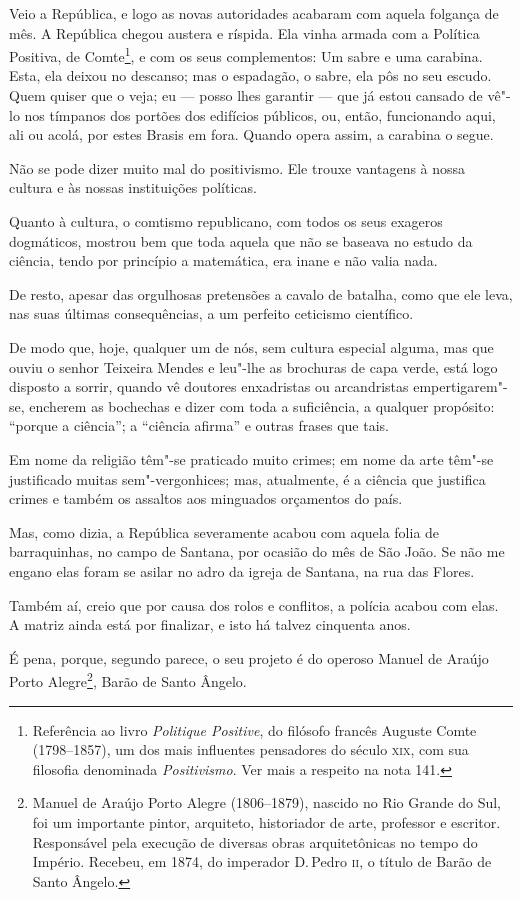 Veio a República, e logo as novas autoridades acabaram com aquela
folgança de mês. A República chegou austera e ríspida. Ela vinha armada
com a Política Positiva, de Comte\footnote{Referência ao livro
  \emph{Politique Positive}, do filósofo francês Auguste Comte (1798--1857), um dos mais influentes pensadores do século \textsc{xix}, com sua
  filosofia denominada \emph{Positivismo}. Ver mais a respeito na nota
  141.}, e com os seus complementos: Um sabre e uma carabina. Esta, ela
deixou no descanso; mas o espadagão, o sabre, ela pôs no seu escudo.
Quem quiser que o veja; eu --- posso lhes garantir --- que já estou
cansado de vê"-lo nos tímpanos dos portões dos edifícios públicos, ou,
então, funcionando aqui, ali ou acolá, por estes Brasis em fora. Quando
opera assim, a carabina o segue.

Não se pode dizer muito mal do positivismo. Ele trouxe vantagens à nossa
cultura e às nossas instituições políticas.

Quanto à cultura, o comtismo republicano, com todos os seus exageros
dogmáticos, mostrou bem que toda aquela que não se baseava no estudo da
ciência, tendo por princípio a matemática, era inane e não valia nada.

De resto, apesar das orgulhosas pretensões a cavalo de batalha, como que
ele leva, nas suas últimas consequências, a um perfeito ceticismo
científico.

De modo que, hoje, qualquer um de nós, sem cultura especial alguma, mas
que ouviu o senhor Teixeira Mendes e leu"-lhe as brochuras de capa verde,
está logo disposto a sorrir, quando vê doutores enxadristas ou
arcandristas empertigarem"-se, encherem as bochechas e dizer com toda a
suficiência, a qualquer propósito: ``porque a ciência''; a ``ciência
afirma'' e outras frases que tais.

Em nome da religião têm"-se praticado muito crimes; em nome da arte
têm"-se justificado muitas sem"-vergonhices; mas, atualmente, é a ciência
que justifica crimes e também os assaltos aos minguados orçamentos do
país.

Mas, como dizia, a República severamente acabou com aquela folia de
barraquinhas, no campo de Santana, por ocasião do mês de São João. Se
não me engano elas foram se asilar no adro da igreja de Santana, na rua
das Flores.

Também aí, creio que por causa dos rolos e conflitos, a polícia acabou
com elas. A matriz ainda está por finalizar, e isto há talvez cinquenta
anos.

É pena, porque, segundo parece, o seu projeto é do operoso Manuel de
Araújo Porto Alegre\footnote{Manuel de Araújo Porto Alegre (1806--1879), nascido no Rio Grande do Sul, foi um importante pintor,
  arquiteto, historiador de arte, professor e escritor. Responsável pela
  execução de diversas obras arquitetônicas no tempo do Império.
  Recebeu, em 1874, do imperador D.\,Pedro \textsc{ii}, o título de Barão de Santo
  Ângelo.}, Barão de Santo Ângelo.

